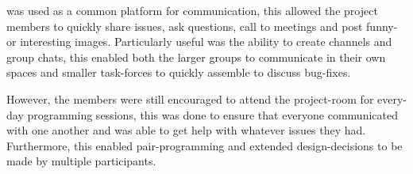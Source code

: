 \slack{} was used as a common platform for communication, this allowed the project members to quickly share issues, ask questions, call to meetings and post funny- or interesting images. Particularly useful was the ability to create channels and group chats, this enabled both the larger groups to communicate in their own spaces and smaller task-forces to quickly assemble to discuss bug-fixes.

However, the members were still encouraged to attend the project-room for every-day programming sessions, this was done to ensure that everyone communicated with one another and was able to get help with whatever issues they had. Furthermore, this enabled pair-programming and extended design-decisions to be made by multiple participants.



